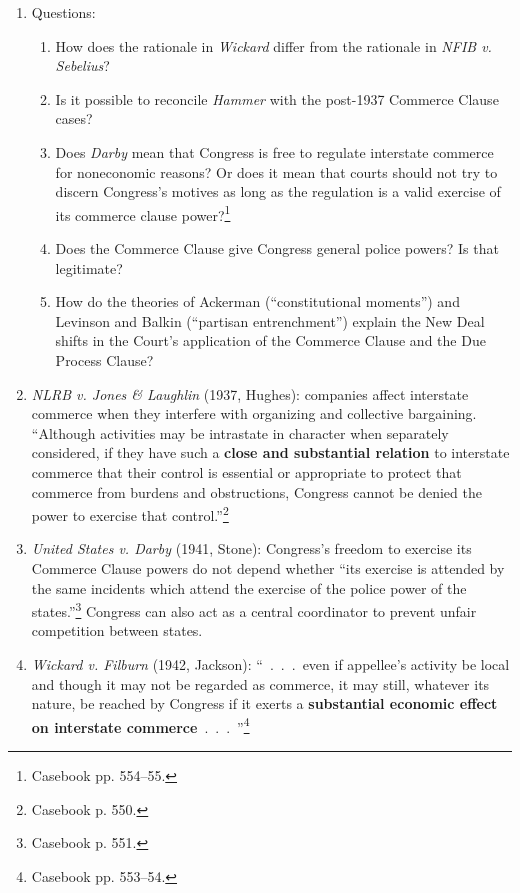 \begin{enumerate}
    \item Questions:
    \begin{enumerate}
        \item How does the rationale in \emph{Wickard} differ from the 
        rationale in \emph{NFIB v. Sebelius}?
        \item Is it possible to reconcile \emph{Hammer} with the post-1937 
        Commerce Clause cases?
        \item Does \emph{Darby} mean that Congress is free to regulate 
        interstate commerce for noneconomic reasons? Or does it mean that 
        courts should not try to discern Congress's motives as long as the 
        regulation is a valid exercise of its commerce clause 
        power?\footnote{Casebook pp. 554--55.}
        \item Does the Commerce Clause give Congress general police powers? Is 
        that legitimate?
        \item How do the theories of Ackerman (``constitutional moments'') and 
        Levinson and Balkin (``partisan entrenchment'') explain the New Deal 
        shifts in the Court's application of the Commerce Clause and the Due 
        Process Clause?
    \end{enumerate}
    \item \emph{NLRB v. Jones \& Laughlin} (1937, Hughes): companies affect 
    interstate commerce when they interfere with organizing and collective 
    bargaining. ``Although activities may be intrastate in character when 
    separately considered, if they have such a \textbf{close and substantial 
    relation} to interstate commerce that their control is essential or 
    appropriate to protect that commerce from burdens and obstructions, 
    Congress cannot be denied the power to exercise that 
    control.''\footnote{Casebook p. 550.}
    \item \emph{United States v. Darby} (1941, Stone): Congress's freedom to 
    exercise its Commerce Clause powers do not depend whether ``its exercise 
    is attended by the same incidents which attend the exercise of the police 
    power of the states.''\footnote{Casebook p. 551.} Congress can also act as 
    a central coordinator to prevent unfair competition between states.
    \item \emph{Wickard v. Filburn} (1942, Jackson): ``~.~.~.~even if 
    appellee's activity be local and though it may not be regarded as 
    commerce, it may still, whatever its nature, be reached by Congress if it 
    exerts a \textbf{substantial economic effect on interstate 
    commerce}~.~.~.~''\footnote{Casebook pp. 553--54.}
\end{enumerate}

